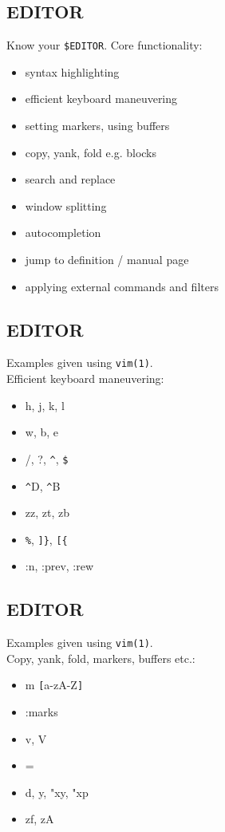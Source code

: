 \documentclass[xga]{xdvislides}
\begin{document}
\subsection{EDITOR}
Know your \verb+$EDITOR+.  Core functionality:
\begin{itemize}
\item syntax highlighting
\item efficient keyboard maneuvering
\item setting markers, using buffers
\item copy, yank, fold e.g. blocks
\item search and replace
\item window splitting
\item autocompletion
\item jump to definition / manual page
\item applying external commands and filters
\end{itemize}

\subsection{EDITOR}
Examples given using {\tt vim(1)}. \\

Efficient keyboard maneuvering:

\begin{itemize}
	\item h, j, k, l
	\item w, b, e
	\item /, ?, \verb+^+, \verb+$+
	\item \verb+^+D, \verb+^+B
	\item zz, zt, zb
	\item \verb+%+, \verb+]}+, \verb+[{+
	\item :n, :prev, :rew
\end{itemize}

\subsection{EDITOR}
Examples given using {\tt vim(1)}. \\

Copy, yank, fold, markers, buffers etc.:
\begin{itemize}
	\item m \verb+[+a-zA-Z\verb+]+
	\item :marks
	\item v, V
	\item =
	\item d, y, "xy, "xp
	\item zf, zA
\end{itemize}
\end{document}
